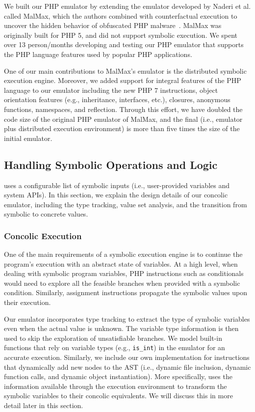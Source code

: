 We built our PHP emulator by extending the emulator developed by Naderi et al. called MalMax, which the authors combined with counterfactual execution to uncover the hidden behavior of obfuscated PHP malware~\cite{naderi2019malmax}. 
MalMax was originally built for PHP 5, and did not support symbolic execution. 
We spent over 13 person/months developing and testing our PHP emulator that supports the PHP language features used by popular PHP applications. 

One of our main contributions to MalMax's emulator is the distributed symbolic execution engine. 
Moreover, we added support for integral features of the PHP language to our emulator including the new PHP 7 instructions, object orientation features (e.g., inheritance, interfaces, etc.), closures, anonymous functions, namespaces, and reflection. 
Through this effort, we have doubled the code size of the original PHP emulator of MalMax, and the final \animatedead{} (i.e., emulator plus distributed execution environment) is more than five times the size of the initial emulator. 

\subsection{Handling Symbolic Operations and Logic}
\animatedead{} uses a configurable list of symbolic inputs (i.e., user-provided variables and system APIs). 
In this section, we explain the design details of our concolic emulator, including the type tracking, value set analysis, and the transition from symbolic to concrete values. 



\subsubsection{Concolic Execution}
\label{sec:concolic_translation}
One of the main requirements of a symbolic execution engine is to continue the program's execution with an abstract state of variables. 
At a high level, when dealing with symbolic program variables, PHP instructions such as conditionals would need to explore all the feasible branches when provided with a symbolic condition. 
Similarly, assignment instructions propagate the symbolic values upon their execution.

Our emulator incorporates type tracking to extract the type of symbolic variables even when the actual value is unknown. 
The variable type information is then used to skip the exploration of unsatisfiable branches. 
We model built-in functions that rely on variable types (e.g., \texttt{is\_int}) in the emulator for an accurate execution. 
Similarly, we include our own implementation for instructions that dynamically add new nodes to the AST (i.e., dynamic file inclusion, dynamic function calls, and dynamic object instantiation). 
More specifically, \animatedead{} uses the information available through the execution environment to transform the symbolic variables to their concolic equivalents. 
We will discuss this in more detail later in this section.

